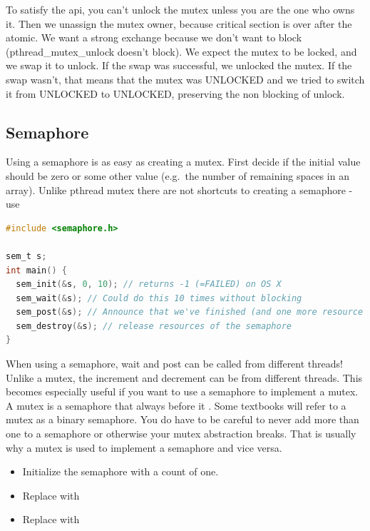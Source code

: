 To satisfy the api, you can't unlock the mutex unless you are the one who owns it. Then we unassign the mutex owner, because critical section is over after the atomic. We want a strong exchange because we don't want to block (pthread\_mutex\_unlock doesn't block). We expect the mutex to be locked, and we swap it to unlock. If the swap was successful, we unlocked the mutex. If the swap wasn't, that means that the mutex was UNLOCKED and we tried to switch it from UNLOCKED to UNLOCKED, preserving the non blocking of unlock.

\subsection{Semaphore}

Using a semaphore is as easy as creating a mutex. First decide if the initial value should be zero or some other value (e.g.~the number of remaining spaces in an array). Unlike pthread mutex there are not shortcuts to creating a semaphore - use 

\begin{lstlisting}[language=C]
#include <semaphore.h>

sem_t s;
int main() {
  sem_init(&s, 0, 10); // returns -1 (=FAILED) on OS X
  sem_wait(&s); // Could do this 10 times without blocking
  sem_post(&s); // Announce that we've finished (and one more resource item is available; increment count)
  sem_destroy(&s); // release resources of the semaphore
}
\end{lstlisting}

When using a semaphore, wait and post can be called from different threads! Unlike a mutex, the increment and decrement can be from different threads. This becomes especially useful if you want to use a semaphore to implement a mutex. A mutex is a semaphore that always  before it . Some textbooks will refer to a mutex as a binary semaphore. You do have to be careful to never add more than one to a semaphore or otherwise your mutex abstraction breaks. That is usually why a mutex is used to implement a semaphore and vice versa.

\begin{itemize}
\item Initialize the semaphore with a count of one. 
\item Replace  with  
\item Replace  with 
\end{itemize}

